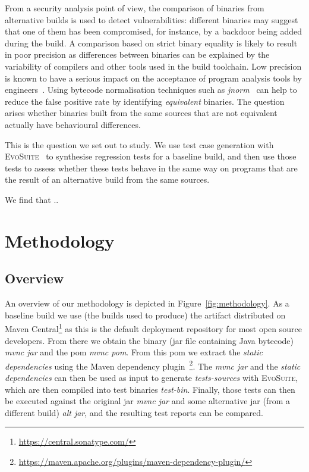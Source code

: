 \documentclass[conference]{IEEEtran}
\makeatletter
\newcommand{\evosuite}{\textsc{EvoSuite}\@\xspace}
\makeatother
\begin{document}
From a security analysis point of view, the comparison of binaries from alternative builds is used to detect vulnerabilities: different binaries may suggest that one of them has been compromised, for instance, by a backdoor being added during the build. A comparison based on strict binary equality is likely to result in poor precision as differences between binaries can be explained by the variability of compilers and other tools used in the build toolchain. Low precision is known to have a serious impact on the acceptance of program analysis tools by engineers~\cite{sadowski2018lessons,distefano2019scaling}. Using bytecode normalisation techniques such as \textit{jnorm}~\cite{schott2024JNorm} can help to reduce the false positive rate by identifying \textit{equivalent} binaries. The question arises whether binaries built from the same sources that are not equivalent actually have behavioural differences.   

This is the question we set out to study. We use test case generation with \evosuite~\cite{fraser2011evosuite} to synthesise regression tests for a baseline build, and then use those tests to assess whether these tests behave in the same way on programs that are the result of an alternative  build from the same sources. 

We find that .. 


\section{Methodology}



\subsection{Overview}

An overview of our methodology is depicted in Figure~\ref{fig:methodology}.  As a baseline build we use (the builds used to produce) the artifact distributed on Maven Central\footnote{\url{https://central.sonatype.com/}} as this is the default deployment repository for most open source developers.  From there we obtain the binary (jar file containing Java bytecode) \textit{mvnc jar} and the pom \textit{mvnc pom}. From this pom we extract the \textit{static dependencies} using the Maven dependency plugin~\footnote{\url{https://maven.apache.org/plugins/maven-dependency-plugin/}}.  The \textit{mvnc jar} and the \textit{static dependencies} can then be used as input to generate \textit{tests-sources} with \evosuite, which are then compiled into test binaries \textit{test-bin}.  Finally, those tests can then be executed against the original jar \textit{mvnc jar} and some alternative jar (from a different build) \textit{alt jar}, and the resulting test reports can be compared.
\end{document}
